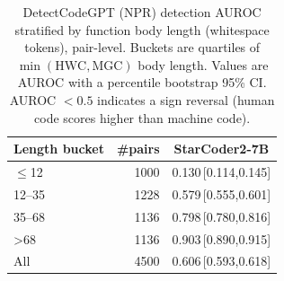 \begin{table}[t]
\centering
\caption{DetectCodeGPT (NPR) detection AUROC stratified by function body length (whitespace tokens), pair-level. Buckets are quartiles of $\min(\text{HWC},\text{MGC})$ body length. Values are AUROC with a percentile bootstrap 95\% CI. AUROC $<0.5$ indicates a sign reversal (human code scores higher than machine code).}
\label{tab:auroc-by-length}
\begin{tabular}{lrc}
\toprule
Length bucket & \#pairs & StarCoder2-7B \\
\midrule
$\leq$12 & 1000 & 0.130\,\tiny[0.114,0.145] \\
12--35 & 1228 & 0.579\,\tiny[0.555,0.601] \\
35--68 & 1136 & 0.798\,\tiny[0.780,0.816] \\
>68 & 1136 & 0.903\,\tiny[0.890,0.915] \\
\midrule
All & 4500 & 0.606\,\tiny[0.593,0.618] \\
\bottomrule
\end{tabular}
\end{table}
